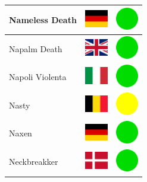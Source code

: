 \documentclass[12pt, a4paper, twoside]{report}
\begin{document}
\begin{center}
\begin{longtable}{|p{5cm}|p{2cm}|p{2cm}|}
 Nameless Death                                             & \includegraphics[width=1cm]{../img/flags/de} &   \includegraphics[width=1cm]{../likes/y} \\ \hline
 Napalm Death                                               & \includegraphics[width=1cm]{../img/flags/gb} &   \includegraphics[width=1cm]{../likes/y} \\ \hline
 Napoli Violenta                                            & \includegraphics[width=1cm]{../img/flags/it} &   \includegraphics[width=1cm]{../likes/y} \\ \hline
 Nasty                                                      & \includegraphics[width=1cm]{../img/flags/be} &   \includegraphics[width=1cm]{../likes/m} \\ \hline
 Naxen                                                      & \includegraphics[width=1cm]{../img/flags/de} &   \includegraphics[width=1cm]{../likes/y} \\ \hline
 Neckbreakker                                               & \includegraphics[width=1cm]{../img/flags/dk} &   \includegraphics[width=1cm]{../likes/y} \\ \hline

\end{longtable}
\end{center}
\end{document}
